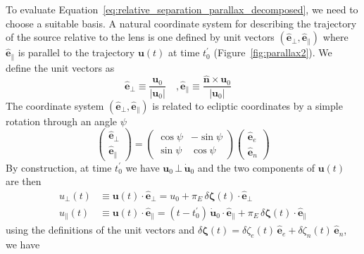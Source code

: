 \documentclass[12pt,dvipsnames]{report}
\begin{document}
To evaluate Equation~\ref{eq:relative_separation_parallax_decomposed}, we need
to choose a suitable basis. A natural coordinate system for describing the
trajectory of the source relative to the lens is one defined by unit vectors
$(\mathbf{\hat e}_\bot,\mathbf{\hat e}_\parallel)$ where $\mathbf{\hat e}_\parallel$ 
is parallel to the trajectory $\mathbf{u}(t)$ at time $t_0^\prime$
(Figure~\ref{fig:parallax2}). 
We define the unit vectors as
\begin{equation}
    \mathbf{\hat e}_\bot\equiv \frac{\mathbf{u}_0}{|\mathbf{u}_0|}\quad,
    \mathbf{\hat e}_\parallel\equiv \frac{\mathbf{\hat n}\times\mathbf{u}_0}{|\mathbf{u}_0|}\quad
\end{equation}
The coordinate system $(\mathbf{\hat e}_\bot,\mathbf{\hat e}_\parallel)$ is related to 
ecliptic coordinates by a simple rotation through an angle $\psi$
\begin{equation}
    \begin{pmatrix}
        \mathbf{\hat e}_\bot \\
        \mathbf{\hat e}_\parallel
    \end{pmatrix}
    =
    \begin{pmatrix}
        \cos\psi & -\sin\psi \\
        \sin\psi & \cos\psi
    \end{pmatrix}
    \begin{pmatrix}
        \mathbf{\hat e}_e \\
        \mathbf{\hat e}_n
    \end{pmatrix}
    \label{eq:ecliptic_to_parallel}
\end{equation}
By construction, at time $t_0^\prime$ we have
$\mathbf{u}_0\,\bot\,\dot{\mathbf{u}}_0$ and the two components of
$\mathbf{u}(t)$ are then
\begin{align}
    u_\bot(t)      & \equiv \mathbf{u}(t)\cdot \mathbf{\hat e}_\bot= u_0 +
    \pi_E\,\delta\boldsymbol \zeta(t)\cdot\mathbf{\hat e}_\bot                                                                                                                                       \\
    u_\parallel(t) & \equiv \mathbf{u}(t)\cdot \mathbf{\hat e}_\parallel= (t-t_0^\prime)\,\dot{\mathbf{u}}_0\cdot\mathbf{\hat e}_\parallel+ \pi_E\,\delta\boldsymbol \zeta(t)\cdot\mathbf{\hat e}_\parallel
\end{align}
using the definitions of the unit vectors and
$\delta\boldsymbol \zeta(t)=
    \delta \zeta_e(t)\,\mathbf{\hat e}_e+\delta \zeta_n(t)\,\mathbf{\hat e}_n$, we have
\end{document}

